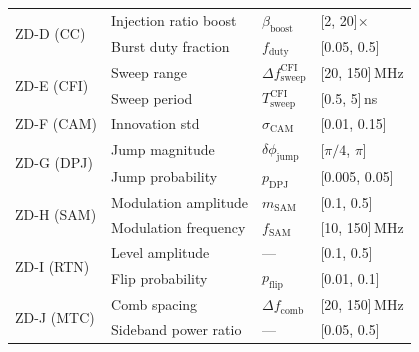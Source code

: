 \documentclass[12pt, a4paper]{report}
\begin{document}
\begin{table}[h]
\begin{tabular}{@{}llll@{}}
\midrule
\multirow{2}{*}{ZD-D (CC)}
    & Injection ratio boost & $\beta_{\text{boost}}$ & [2, 20]$\times$ \\
    & Burst duty fraction   & $f_{\text{duty}}$      & [0.05, 0.5] \\
\midrule
\multirow{2}{*}{ZD-E (CFI)}
    & Sweep range          & $\Delta f_{\text{sweep}}^{\text{CFI}}$ & [20, 150]\,MHz \\
    & Sweep period         & $T_{\text{sweep}}^{\text{CFI}}$        & [0.5, 5]\,ns \\
\midrule
ZD-F (CAM) & Innovation std       & $\sigma_{\text{CAM}}$ & [0.01, 0.15] \\
\midrule
\multirow{2}{*}{ZD-G (DPJ)}
    & Jump magnitude       & $\delta\phi_{\text{jump}}$ & [$\pi/4$, $\pi$] \\
    & Jump probability     & $p_{\text{DPJ}}$           & [0.005, 0.05] \\
\midrule
\multirow{2}{*}{ZD-H (SAM)}
    & Modulation amplitude & $m_{\text{SAM}}$ & [0.1, 0.5] \\
    & Modulation frequency & $f_{\text{SAM}}$ & [10, 150]\,MHz \\
\midrule
\multirow{2}{*}{ZD-I (RTN)}
    & Level amplitude      & --- & [0.1, 0.5] \\
    & Flip probability     & $p_{\text{flip}}$ & [0.01, 0.1] \\
\midrule
\multirow{2}{*}{ZD-J (MTC)}
    & Comb spacing         & $\Delta f_{\text{comb}}$ & [20, 150]\,MHz \\
    & Sideband power ratio & --- & [0.05, 0.5] \\
\bottomrule
\end{tabular}
\end{table}
\end{document}
